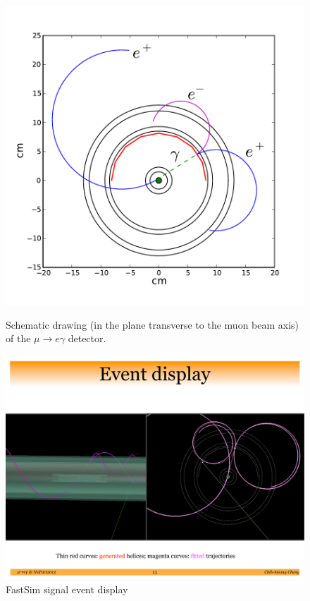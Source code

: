 \begin{figure}[htbp]
\centering
\begin{minipage}[c]{0.47\textwidth}
\centering
\includegraphics[width=\textwidth]{Figures/muegamma-schematic.pdf}
\caption{Schematic drawing (in the plane transverse to the muon beam axis) of the $\mu\to e\gamma$ detector.}
\label{fig:detscheme}
\end{minipage}
\quad
\begin{minipage}[c]{0.47\textwidth}
\centering
\includegraphics[width=\textwidth]{Figures/event_display.pdf}
\caption{FastSim signal event display}
\label{fig:evtdisplay}
\end{minipage}
\end{figure}

